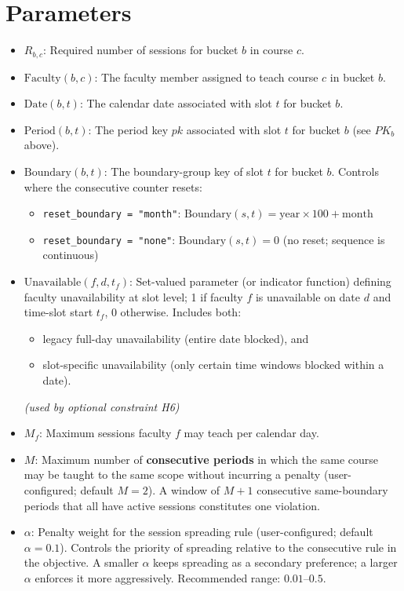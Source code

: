 \documentclass{article}
\begin{document}
\section{Parameters}
\begin{itemize}
    \item $R_{b,c}$: Required number of sessions for bucket $b$ in course $c$.
    \item $\mathrm{Faculty}(b,c)$: The faculty member assigned to teach course $c$ in bucket $b$.
    \item $\mathrm{Date}(b,t)$: The calendar date associated with slot $t$ for bucket $b$.
    \item $\mathrm{Period}(b,t)$: The period key $pk$ associated with slot $t$ for bucket $b$ (see $PK_b$ above).
    \item $\mathrm{Boundary}(b,t)$: The boundary-group key of slot $t$ for bucket $b$. Controls where the consecutive counter resets:
    \begin{itemize}
        \item \texttt{reset\_boundary = "month"}:
              $\mathrm{Boundary}(s,t) = \text{year} \times 100 + \text{month}$
        \item \texttt{reset\_boundary = "none"}:
              $\mathrm{Boundary}(s,t) = 0$ \quad (no reset; sequence is continuous)
    \end{itemize}
    \item $\mathrm{Unavailable}(f,d,t_f)$: Set-valued parameter (or indicator function) defining faculty unavailability at slot level; 1 if faculty $f$ is unavailable on date $d$ and time-slot start $t_f$, 0 otherwise. Includes both:
        \begin{itemize}
            \item legacy full-day unavailability (entire date blocked), and
            \item slot-specific unavailability (only certain time windows blocked within a date).
        \end{itemize}
        \quad \emph{(used by optional constraint H6)}
    \item $M_f$: Maximum sessions faculty $f$ may teach per calendar day.
    \item $M$: Maximum number of \textbf{consecutive periods} in which the same course may be taught to the same scope without incurring a penalty (user-configured; default $M=2$). A window of $M+1$ consecutive same-boundary periods that all have active sessions constitutes one violation.
    \item $\alpha$: Penalty weight for the session spreading rule (user-configured; default $\alpha = 0.1$). Controls the priority of spreading relative to the consecutive rule in the objective. A smaller $\alpha$ keeps spreading as a secondary preference; a larger $\alpha$ enforces it more aggressively. Recommended range: $0.01$--$0.5$.

\end{itemize}
\end{document}
